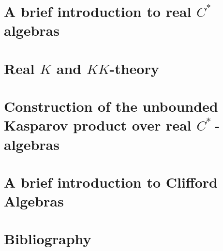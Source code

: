 \documentclass[10pt,a4paper,twoside]{article}
\author{Emil Frølich}
\theoremstyle{definition}
\newcommand{\Cstar}{$C^*~$}
\begin{document}
\tableofcontents
\newpage
\setcounter{page}{1}

\newpage

\newpage
\section{A brief introduction to real \Cstar algebras}

\newpage
\section{Real $K$ and $KK$-theory}

\newpage
\section{Construction of the unbounded Kasparov product over real \Cstar-algebras}




\newpage
\appendix
\section{A brief introduction to Clifford Algebras}

\newpage
\section{Bibliography}


\end{document}
